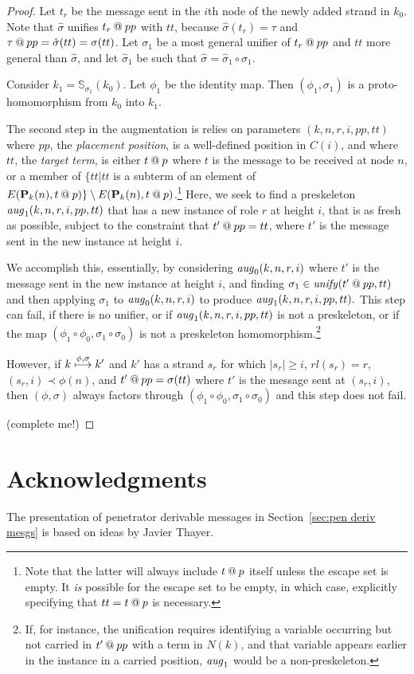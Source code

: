 \documentclass[12pt]{article}
\theoremstyle{definition}
\newcommand{\pubmsg}{\mathbf{P}}
\newcommand{\aug}{\fn{aug}}
\begin{document}
\begin{proof}

Let $t_r$ be the message sent in the $i$th node of the newly added strand in $k_0$.
Note that $\hat{\sigma}$ unifies $t_r \mathbin{@} pp$ with $tt$, because $\hat{\sigma}(t_r) = \tau$ and
$\tau \mathbin{@} pp = \hat{\sigma}(tt) = \sigma(tt)$.  Let $\sigma_1$ be a most general unifier of $t_r \mathbin{@} pp$
and $tt$ more general than $\hat{\sigma}$, and let $\hat{\sigma}_1$ be such that $\hat{\sigma} = \hat{\sigma}_1 \circ
\sigma_1$.

Consider $k_1 = \mathbb{S}_{\sigma_1}(k_0)$.  Let $\phi_1$ be the identity map.  Then $(\phi_1,\sigma_1)$ is a proto-homomorphism
from $k_0$ into $k_1$.

The second step in the augmentation is relies on parameters $(k,n,r,i,pp,tt)$ where $pp$, the {\em placement position}, is a well-defined
position in $C(i)$, and where $tt$, the {\em target term}, is either $t \mathbin{@} p$ where $t$ is the message to be received
at node $n$, or a member of $\{tt | tt$ is a subterm of an element of $E(\pubmsg_k(n),t \termat p)\} \setminus E(\pubmsg_k(n),t
\termat p)$.\footnote{Note that the latter will always include $t \mathbin{@} p$ itself unless the escape set is empty.  It {\em is}
possible for the escape set to be empty, in which case, explicitly specifying that $tt = t \mathbin{@} p$ is necessary.}  Here, we
seek to find a preskeleton $\aug_1(k,n,r,i,pp,tt)$ that has a new instance of role $r$ at height $i$, that is as fresh as possible,
subject to the constraint that $t' \mathbin{@} pp = tt$, where $t'$ is the message sent in the new instance at height $i$.

We accomplish this, essentially, by considering $\aug_0(k,n,r,i)$ where $t'$ is the message sent in the new instance at height $i$,
and finding $\sigma_1 \in \operatorname{\mathit{unify}}(t' \mathbin{@} pp, tt)$ and then applying $\sigma_1$ to $\aug_0(k,n,r,i)$ to produce
$\aug_1(k,n,r,i,pp,tt).$  This step can fail, if there is no unifier, or if $\aug_1(k,n,r,i,pp,tt)$ is not a preskeleton, or if the
map $(\phi_1 \circ \phi_0, \sigma_1 \circ \sigma_0)$ is not a preskeleton homomorphism.\footnote{If,
for instance, the unification requires identifying a variable occurring but not carried in $t' \mathbin{@} pp$ with a term in $N(k)$, and
that variable appears earlier in the instance in a carried position, $\aug_1$ would be a non-preskeleton.}

However, if $k\stackrel{\phi,\sigma}{\longmapsto}k'$ and $k'$ has a strand $s_r$ for which $|s_r| \geq i$, $rl(s_r) = r$, $(s_r,i) \prec \phi(n)$,
and $t' \mathbin{@} pp = \sigma(tt)$ where $t'$ is the message sent at $(s_r, i)$, then $(\phi,\sigma)$ always factors through $(\phi_1 \circ
\phi_0, \sigma_1 \circ \sigma_0)$ and this step does not fail.


(complete me!)

\end{proof}

\section*{Acknowledgments}

The presentation of penetrator derivable messages in
Section~\ref{sec:pen deriv mesgs} is based on ideas by Javier Thayer.



\end{document}
